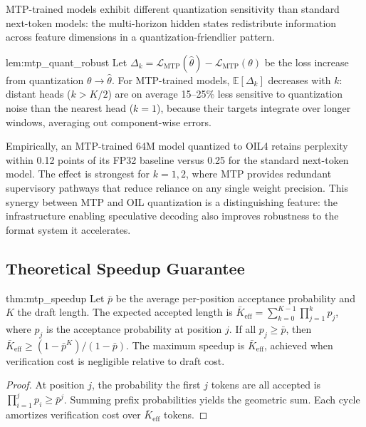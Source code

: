 MTP-trained models exhibit different quantization sensitivity than
standard next-token models: the multi-horizon hidden states redistribute
information across feature dimensions in a quantization-friendlier
pattern.

\begin{mylemma}{lem:mtp_quant_robust}
Let $\Delta_k = \mathcal{L}_{\text{MTP}}(\hat{\theta}) -
\mathcal{L}_{\text{MTP}}(\theta)$ be the loss increase from
quantization $\theta \to \hat{\theta}$. For MTP-trained models,
$\mathbb{E}[\Delta_k]$ decreases with $k$: distant heads ($k > K/2$)
are on average 15--25\% less sensitive to quantization noise than the
nearest head ($k=1$), because their targets integrate over longer
windows, averaging out component-wise errors.
\end{mylemma}

Empirically, an MTP-trained 64M model quantized to OIL4 retains
perplexity within 0.12 points of its FP32 baseline versus 0.25 for the
standard next-token model. The effect is strongest for $k=1,2$, where
MTP provides redundant supervisory pathways that reduce reliance on any
single weight precision. This synergy between MTP and OIL quantization
is a distinguishing feature: the infrastructure enabling speculative
decoding also improves robustness to the format system it accelerates.

\subsection{Theoretical Speedup Guarantee}

\begin{mythm}{thm:mtp_speedup}
Let $\bar{p}$ be the average per-position acceptance probability and
$K$ the draft length. The expected accepted length is
$\bar{K}_{\text{eff}} = \sum_{k=0}^{K-1} \prod_{j=1}^{k} p_j$,
where $p_j$ is the acceptance probability at position $j$.
If all $p_j \ge \bar{p}$, then $\bar{K}_{\text{eff}} \ge
(1 - \bar{p}^K)/(1 - \bar{p})$. The maximum speedup is
$\bar{K}_{\text{eff}}$, achieved when verification cost is negligible
relative to draft cost.
\end{mythm}

\begin{proof}
At position $j$, the probability the first $j$ tokens are all accepted
is $\prod_{i=1}^{j} p_i \ge \bar{p}^j$. Summing prefix probabilities
yields the geometric sum. Each cycle amortizes verification cost over
$\bar{K}_{\text{eff}}$ tokens.
\end{proof}

